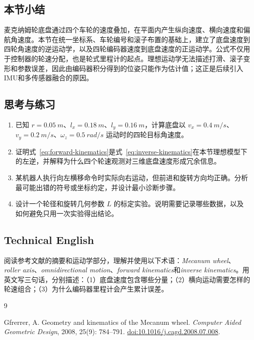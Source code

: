 \documentclass[UTF8,zihao=-4]{ctexart}
\begin{document}
\subsection*{本节小结}

麦克纳姆轮底盘通过四个车轮的速度叠加，在平面内产生纵向速度、横向速度和偏航角速度。本节在统一坐标系、车轮编号和滚子布置的基础上，建立了底盘速度到四轮角速度的逆运动学，以及四轮编码器速度到底盘速度的正运动学。公式不仅用于控制器的轮速分配，也是轮式里程计的起点。理想运动学无法描述打滑、滚子变形和参数误差，因此由编码器积分得到的位姿只能作为估计值；这正是后续引入IMU和多传感器融合的原因。

\subsection*{思考与练习}

\begin{enumerate}
  \item 已知 $r=\SI{0.05}{m}$、$l_x=\SI{0.18}{m}$、$l_y=\SI{0.16}{m}$，计算底盘以 $v_x=\SI{0.4}{m/s}$、$v_y=\SI{0.2}{m/s}$、$\omega_z=\SI{0.5}{rad/s}$ 运动时的四轮目标角速度。
  \item 证明式~\eqref{eq:forward-kinematics}是式~\eqref{eq:inverse-kinematics}在本节理想模型下的左逆，并解释为什么四个轮速观测对三维底盘速度形成冗余信息。
  \item 某机器人执行向左横移命令时实际向右运动，但前进和旋转方向均正确。分析最可能出错的符号或坐标约定，并设计最小诊断步骤。
  \item 设计一个轮径和旋转几何参数 $L$ 的标定实验。说明需要记录哪些数据，以及如何避免只用一次实验得出结论。
\end{enumerate}

\subsection*{Technical English}

阅读参考文献\cite{gfrerrer2008}的摘要和运动学部分，理解并使用以下术语：\emph{Mecanum wheel}、\emph{roller axis}、\emph{omnidirectional motion}、\emph{forward kinematics}和\emph{inverse kinematics}。用英文写三句话，分别描述：（1）底盘速度包含哪些分量；（2）横向运动需要怎样的轮速组合；（3）为什么编码器里程计会产生累计误差。

\begin{thebibliography}{9}

Gfrerrer, A.
Geometry and kinematics of the Mecanum wheel.
\emph{Computer Aided Geometric Design}, 2008, 25(9): 784--791.
\href{https://doi.org/10.1016/j.cagd.2008.07.008}{doi:10.1016/j.cagd.2008.07.008}.

\end{thebibliography}
\end{document}
